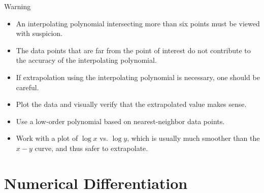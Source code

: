\documentclass{beamer}
\begin{document}
\begin{frame}{Warning}
\begin{itemize}
\item An interpolating polynomial intersecting more than \alert{six points} must be viewed with suspicion. 
\item The data points that are far from the point of interest do not contribute to the accuracy of the interpolating polynomial. 
\item  If \alert{extrapolation} using the interpolating polynomial is necessary, one should be careful.
\item \alert{Plot the data} and visually verify that the extrapolated value makes sense. 
\item	Use a \alert{low-order polynomial} based on nearest-neighbor data points. 
\item Work with a plot of $\log x$ vs. $\log y$, which is usually much smoother than the $x-y$
curve, and thus safer to extrapolate.
\end{itemize}
\end{frame}
%
%
\section[Numerical Differentiation]{Numerical Differentiation}
\end{document}
